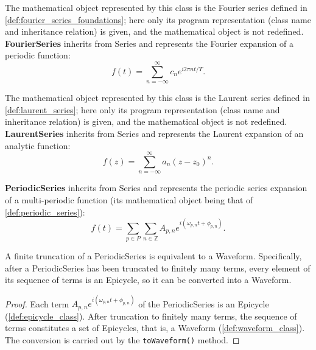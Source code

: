 \begin{definition}\label{def:fourier_series_class}
The mathematical object represented by this class is the Fourier series defined in \cref{def:fourier_series_foundations}; here only its program representation (class name and inheritance relation) is given, and the mathematical object is not redefined. \textbf{FourierSeries} inherits from Series and represents the Fourier expansion of a periodic function:
\[
f(t) = \sum_{n=-\infty}^{\infty} c_n e^{i 2\pi n t / T}.
\]
\end{definition}

\begin{definition}\label{def:laurent_series_class}
The mathematical object represented by this class is the Laurent series defined in \cref{def:laurent_series}; here only its program representation (class name and inheritance relation) is given, and the mathematical object is not redefined. \textbf{LaurentSeries} inherits from Series and represents the Laurent expansion of an analytic function:
\[
f(z) = \sum_{n=-\infty}^{\infty} a_n (z - z_0)^n.
\]
\end{definition}

\begin{definition}\label{def:periodic_series_class}
\textbf{PeriodicSeries} inherits from Series and represents the periodic series expansion of a multi-periodic function (its mathematical object being that of \cref{def:periodic_series}):
\[
f(t) = \sum_{p \in P} \sum_{n \in \mathbb{Z}} A_{p,n} e^{i(\omega_{p,n} t + \phi_{p,n})}.
\]
\end{definition}

\begin{proposition}\label{prop:series_waveform_relation}
A finite truncation of a PeriodicSeries is equivalent to a Waveform. Specifically, after a PeriodicSeries has been truncated to finitely many terms, every element of its sequence of terms is an Epicycle, so it can be converted into a Waveform.
\end{proposition}

\begin{proof}
Each term $A_{p,n} e^{i(\omega_{p,n} t + \phi_{p,n})}$ of the PeriodicSeries is an Epicycle (\cref{def:epicycle_class}). After truncation to finitely many terms, the sequence of terms constitutes a set of Epicycles, that is, a Waveform (\cref{def:waveform_class}). The conversion is carried out by the \texttt{toWaveform()} method.
\end{proof}

